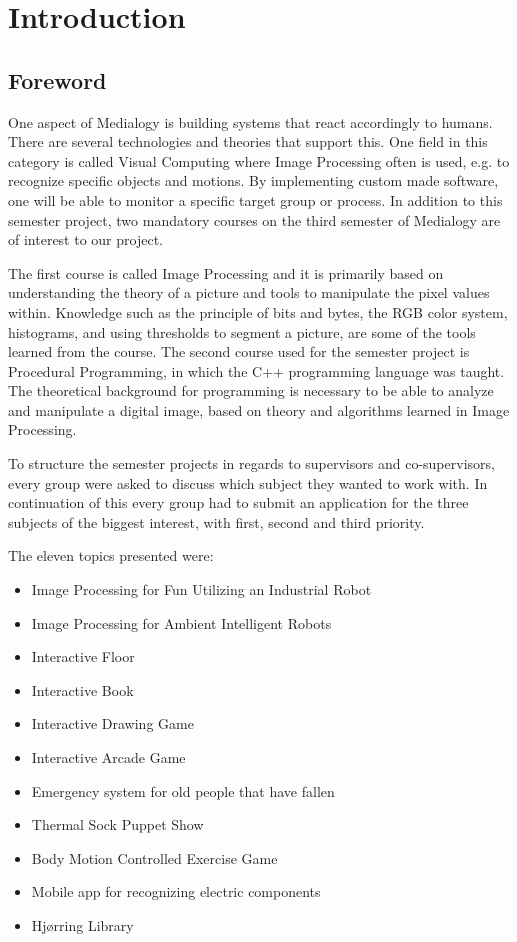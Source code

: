 \chapter{Introduction}
\section{Foreword}
One aspect of Medialogy is building systems that react accordingly to humans. There are several technologies and theories that support this. One field in this category is called Visual Computing where Image Processing often is used, e.g. to recognize specific objects and motions. By implementing custom made software, one will be able to monitor a specific target group or process. In addition to this semester project, two mandatory courses on the third semester of Medialogy are of interest to our  project.

The first course is called Image Processing and it is primarily based on understanding the theory of a picture and tools to manipulate the pixel values within. Knowledge such as the principle of bits and bytes, the RGB color system, histograms, and using thresholds to segment a picture, are some of the tools learned from the course. The second course used for the semester project is Procedural Programming, in which the C++ programming language was taught. The theoretical background for programming is necessary to be able to analyze and manipulate a digital image, based on theory and algorithms learned in Image Processing.

To structure the semester projects in regards to supervisors and co-supervisors, every group were asked to discuss which subject they wanted to work with. In continuation of this every group had to submit an application for the three subjects of the biggest interest, with first, second and third priority.

The eleven topics presented were:

\begin{itemize}
\item Image Processing for Fun Utilizing an Industrial Robot
\item Image Processing for Ambient Intelligent Robots
\item Interactive Floor
\item Interactive Book
\item Interactive Drawing Game
\item Interactive Arcade Game
\item Emergency system for old people that have fallen
\item Thermal Sock Puppet Show
\item Body Motion Controlled Exercise Game
\item Mobile app for recognizing electric components
\item Hj{\o}rring Library
\end{itemize}

